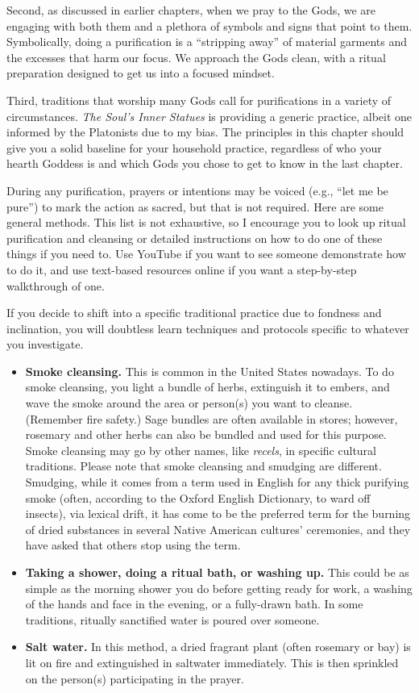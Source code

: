 \documentclass[
]{book}
\providecommand{\tightlist}{%
  \setlength{\itemsep}{0pt}\setlength{\parskip}{0pt}}
\begin{document}
Second, as discussed in earlier chapters, when we pray to the Gods, we are engaging with both them and a plethora of symbols and signs that point to them. Symbolically, doing a purification is a ``stripping away'' of material garments and the excesses that harm our focus. We approach the Gods clean, with a ritual preparation designed to get us into a focused mindset.

Third, traditions that worship many Gods call for purifications in a variety of circumstances. \emph{The Soul's Inner Statues} is providing a generic practice, albeit one informed by the Platonists due to my bias. The principles in this chapter should give you a solid baseline for your household practice, regardless of who your hearth Goddess is and which Gods you chose to get to know in the last chapter.

During any purification, prayers or intentions may be voiced (e.g., ``let me be pure'') to mark the action as sacred, but that is not required. Here are some general methods. This list is not exhaustive, so I encourage you to look up ritual purification and cleansing or detailed instructions on how to do one of these things if you need to. Use YouTube if you want to see someone demonstrate how to do it, and use text-based resources online if you want a step-by-step walkthrough of one.

If you decide to shift into a specific traditional practice due to fondness and inclination, you will doubtless learn techniques and protocols specific to whatever you investigate.

\begin{itemize}
\tightlist
\item
  \textbf{Smoke cleansing.} This is common in the United States nowadays. To do smoke cleansing, you light a bundle of herbs, extinguish it to embers, and wave the smoke around the area or person(s) you want to cleanse. (Remember fire safety.) Sage bundles are often available in stores; however, rosemary and other herbs can also be bundled and used for this purpose. Smoke cleansing may go by other names, like \emph{recels}, in specific cultural traditions. Please note that smoke cleansing and smudging are different. Smudging, while it comes from a term used in English for any thick purifying smoke (often, according to the Oxford English Dictionary, to ward off insects), via lexical drift, it has come to be the preferred term for the burning of dried substances in several Native American cultures' ceremonies, and they have asked that others stop using the term.
\item
  \textbf{Taking a shower, doing a ritual bath, or washing up.} This could be as simple as the morning shower you do before getting ready for work, a washing of the hands and face in the evening, or a fully-drawn bath. In some traditions, ritually sanctified water is poured over someone.
\item
  \textbf{Salt water.} In this method, a dried fragrant plant (often rosemary or bay) is lit on fire and extinguished in saltwater immediately. This is then sprinkled on the person(s) participating in the prayer.
\end{itemize}
\end{document}
